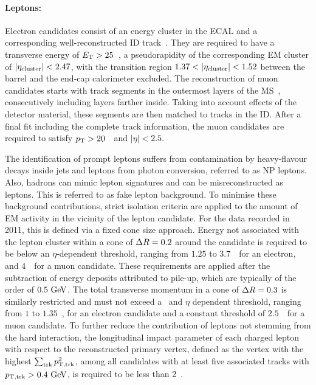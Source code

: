 %
\paragraph{Leptons:}\mbox{}
Electron candidates consist of an energy cluster in the \gls{ECAL} and a corresponding well-reconstructed \gls{ID} track~\cite{CERN-PH-EP-2014-040}. 
%
They are required to have a transverse energy of $E_\mathrm{T}>25$~\GeV, a pseudorapidity of the corresponding \gls{EM} cluster of $\vert\eta_\mathrm{cluster}\vert < 2.47$, with the transition region $1.37<\vert\eta_\mathrm{cluster}\vert<1.52$ between the barrel and the end-cap calorimeter excluded. 
%
The reconstruction of muon candidates starts with track segments in the outermost layers of the \gls{MS}~\cite{CERN-PH-EP-2014-151}, consecutively including layers farther inside. 
%
Taking into account effects of the detector material, these segments are then matched to tracks in the \gls{ID}. 
%
After a final fit including the complete track information, the muon candidates are required to satisfy $p_\mathrm{T}>20$~\GeV\ and $\vert\eta\vert<2.5$.


The identification of prompt leptons suffers from contamination by heavy-flavour decays inside jets and leptons from photon conversion, referred to as \gls{NP} leptons. 
%
Also, hadrons can mimic lepton signatures and can be misreconstructed as leptons. This is referred to as fake lepton background.
%
To minimise these background contributions, strict isolation criteria are applied to the amount of \gls{EM} activity in the vicinity of the lepton candidate. For the data recorded in 2011, this is defined via a fixed cone size approach.
%
Energy not associated with the lepton cluster within a cone of $\Delta R = 0.2$ around the candidate is required to be below an $\eta$-dependent threshold, ranging from $1.25$ to $3.7$~\GeV\ for an electron, and $4$~\GeV\ for a muon candidate. These requirements are applied after the subtraction of energy deposits attributed to pile-up, which are typically of the order of $0.5~\mathrm{GeV}$.
%
The total transverse momentum in a cone of $\Delta R = 0.3$ is similarly restricted and must not exceed a \pt\ and $\eta$ dependent threshold, ranging from $1$ to $1.35$~\GeV, for an electron candidate and a constant threshold of $2.5$~\GeV\ for a muon candidate. 
%
To further reduce the contribution of leptons not stemming from the hard interaction, the longitudinal impact parameter of each charged lepton with respect to the reconstructed primary vertex, defined  as the vertex with the highest $\sum_{\rm trk} p_{\rm T,trk}^2$, among all candidates with at least five associated tracks with $p_{\rm T,trk} > 0.4~\mathrm{GeV}$, is required to be less than 2~\mm.



